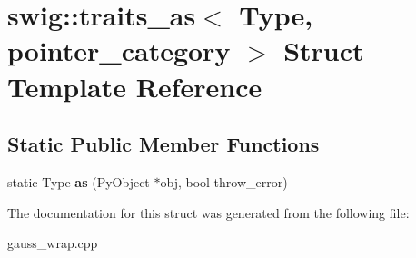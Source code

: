 \hypertarget{structswig_1_1traits__as_3_01_type_00_01pointer__category_01_4}{\section{swig\-:\-:traits\-\_\-as$<$ Type, pointer\-\_\-category $>$ Struct Template Reference}
\label{structswig_1_1traits__as_3_01_type_00_01pointer__category_01_4}
}
\subsection*{Static Public Member Functions}
\begin{DoxyCompactItemize}
\item 
\hypertarget{structswig_1_1traits__as_3_01_type_00_01pointer__category_01_4_af4d6146e7890c389c1a8c87ff57a0366}{static Type {\bfseries as} (Py\-Object $\ast$obj, bool throw\-\_\-error)}\label{structswig_1_1traits__as_3_01_type_00_01pointer__category_01_4_af4d6146e7890c389c1a8c87ff57a0366}

\end{DoxyCompactItemize}


The documentation for this struct was generated from the following file\-:\begin{DoxyCompactItemize}
\item 
gauss\-\_\-wrap.\-cpp\end{DoxyCompactItemize}
